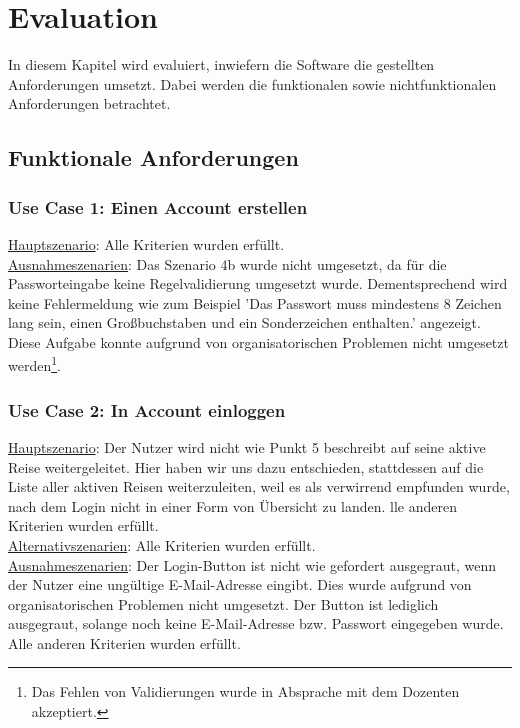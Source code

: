 \section{Evaluation}
In diesem Kapitel wird evaluiert, inwiefern die Software die gestellten Anforderungen umsetzt. Dabei werden die funktionalen sowie nichtfunktionalen Anforderungen betrachtet.

\subsection{Funktionale Anforderungen}\label{funktionale-anforderungen}

\subsubsection*{Use Case 1: Einen Account erstellen}
\begin{addmargin}{10pt}
\underline{Hauptszenario}: Alle Kriterien wurden erfüllt.\\
\underline{Ausnahmeszenarien}: Das Szenario 4b wurde nicht umgesetzt, da für die Passworteingabe keine Regelvalidierung umgesetzt wurde. 
Dementsprechend wird keine Fehlermeldung wie zum Beispiel 'Das Passwort muss mindestens 8 Zeichen lang sein, einen Großbuchstaben und ein Sonderzeichen enthalten.' angezeigt. 
Diese Aufgabe konnte aufgrund von organisatorischen Problemen nicht umgesetzt werden\footnote{Das Fehlen von Validierungen wurde in Absprache mit dem Dozenten akzeptiert.}.
\end{addmargin}

\subsubsection*{Use Case 2: In Account einloggen}

\begin{addmargin}{10pt}
\underline{Hauptszenario}: Der Nutzer wird nicht wie Punkt 5 beschreibt auf seine aktive Reise weitergeleitet. 
Hier haben wir uns dazu entschieden, stattdessen auf die Liste aller aktiven Reisen weiterzuleiten, weil es als verwirrend empfunden wurde, nach dem Login nicht in einer Form von Übersicht zu landen. 
lle anderen Kriterien wurden erfüllt.\\
\underline{Alternativszenarien}: Alle Kriterien wurden erfüllt.\\
\underline{Ausnahmeszenarien}: Der Login-Button ist nicht wie gefordert ausgegraut, wenn der Nutzer eine ungültige E-Mail-Adresse eingibt. 
Dies wurde aufgrund von organisatorischen Problemen nicht umgesetzt.
Der Button ist lediglich ausgegraut, solange noch keine E-Mail-Adresse bzw. Passwort eingegeben wurde. 
Alle anderen Kriterien wurden erfüllt.
\end{addmargin}

